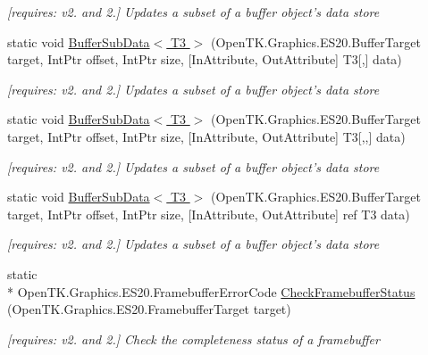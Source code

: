 \begin{DoxyCompactItemize}
\begin{DoxyCompactList}\small\item\em \mbox{[}requires\-: v2. and 2.\mbox{]} Updates a subset of a buffer object's data store \end{DoxyCompactList}\item 
static void \hyperlink{class_open_t_k_1_1_graphics_1_1_e_s20_1_1_g_l_a1f17e97d92c1f84b41a3c094f140c7b3}{Buffer\-Sub\-Data$<$ T3 $>$} (Open\-T\-K.\-Graphics.\-E\-S20.\-Buffer\-Target target, Int\-Ptr offset, Int\-Ptr size, \mbox{[}In\-Attribute, Out\-Attribute\mbox{]} T3\mbox{[},\mbox{]} data)
\begin{DoxyCompactList}\small\item\em \mbox{[}requires\-: v2. and 2.\mbox{]} Updates a subset of a buffer object's data store \end{DoxyCompactList}\item 
static void \hyperlink{class_open_t_k_1_1_graphics_1_1_e_s20_1_1_g_l_a4bbf79d8229a1128d9e8d49817a4dcaa}{Buffer\-Sub\-Data$<$ T3 $>$} (Open\-T\-K.\-Graphics.\-E\-S20.\-Buffer\-Target target, Int\-Ptr offset, Int\-Ptr size, \mbox{[}In\-Attribute, Out\-Attribute\mbox{]} T3\mbox{[},,\mbox{]} data)
\begin{DoxyCompactList}\small\item\em \mbox{[}requires\-: v2. and 2.\mbox{]} Updates a subset of a buffer object's data store \end{DoxyCompactList}\item 
static void \hyperlink{class_open_t_k_1_1_graphics_1_1_e_s20_1_1_g_l_aebbb541f3fd6020d58223339646a6020}{Buffer\-Sub\-Data$<$ T3 $>$} (Open\-T\-K.\-Graphics.\-E\-S20.\-Buffer\-Target target, Int\-Ptr offset, Int\-Ptr size, \mbox{[}In\-Attribute, Out\-Attribute\mbox{]} ref T3 data)
\begin{DoxyCompactList}\small\item\em \mbox{[}requires\-: v2. and 2.\mbox{]} Updates a subset of a buffer object's data store \end{DoxyCompactList}\item 
static \\*
Open\-T\-K.\-Graphics.\-E\-S20.\-Framebuffer\-Error\-Code \hyperlink{class_open_t_k_1_1_graphics_1_1_e_s20_1_1_g_l_a4f6aeb29cee61125a907de40f590718f}{Check\-Framebuffer\-Status} (Open\-T\-K.\-Graphics.\-E\-S20.\-Framebuffer\-Target target)
\begin{DoxyCompactList}\small\item\em \mbox{[}requires\-: v2. and 2.\mbox{]} Check the completeness status of a framebuffer \end{DoxyCompactList}\item 

\end{DoxyCompactItemize}
